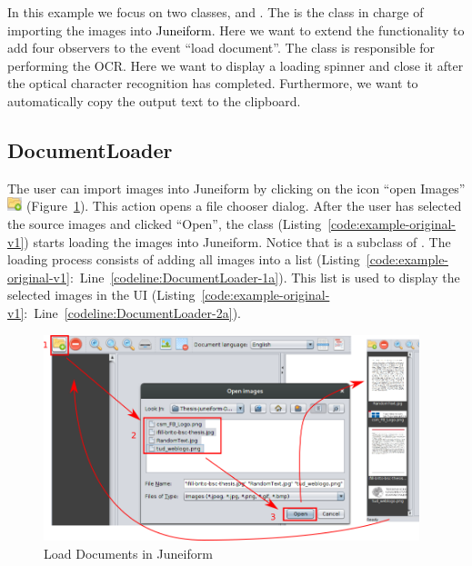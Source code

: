 \documentclass[type=bsc,accentcolor=tud9c]{tudthesis}
\newcommand{\framework}[1]{\textcolor{black}{#1}}
\begin{document}
In this example we focus on two classes,  and . The  is the class in charge of importing the images into \framework{Juneiform}. Here we want to extend the functionality to add four observers to the event ``load document''. The  class is responsible for performing the OCR. Here we want to display a loading spinner and close it after the optical character recognition has completed. Furthermore, we want to automatically copy the output text to the clipboard.

\subsection{DocumentLoader}

The user can import images into Juneiform by clicking on the icon ``open Images'' \includegraphics[height=0.4cm]{juneiform/open-icon.png} (Figure~\ref{fig:loadDocs}). This action opens a file chooser dialog. After the user has selected the source images and clicked ``Open'', the class  (Listing~\ref{code:example-original-v1}) starts loading the images into Juneiform. Notice that  is a subclass of . The loading process consists of adding all images into a list (Listing~\ref{code:example-original-v1}:~Line~\ref{codeline:DocumentLoader-1a}). This list is used to display the selected images in the UI (Listing~\ref{code:example-original-v1}:~Line~\ref{codeline:DocumentLoader-2a}).

\begin{figure}[H]
\begin{center}
\includegraphics[height=6cm]{juneiform/DocumentLoader.png}
\caption{Load Documents in Juneiform}
\label{fig:loadDocs}
\end{center}
\end{figure}
\end{document}
